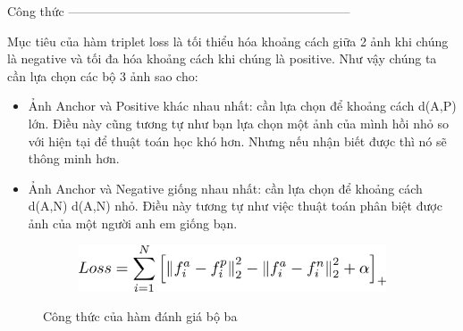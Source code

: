 Công thức --------------------------------------------------------------------

Mục tiêu của hàm triplet loss là tối thiểu hóa khoảng cách giữa 2 ảnh khi chúng là
negative và tối đa hóa khoảng cách khi chúng là positive.
Như vậy chúng ta cần lựa chọn các bộ 3 ảnh sao cho:
\begin{itemize}
    \item Ảnh Anchor và Positive khác nhau nhất: cần lựa chọn để khoảng cách d(A,P) lớn.
          Điều này cũng tương tự như bạn lựa chọn một ảnh của mình hồi nhỏ so với hiện tại để
          thuật toán học khó hơn. Nhưng nếu nhận biết được thì nó sẽ thông minh hơn.
    \item Ảnh Anchor và Negative giống nhau nhất: cần lựa chọn để khoảng cách d(A,N)
          d(A,N) nhỏ. Điều này tương tự như việc thuật toán phân biệt được ảnh của một người
          anh em giống bạn.
\end{itemize}

\begin{figure}
    \begin{subfigure}{0.8\textwidth}
        \begin{center}
            \includegraphics[width=1.\linewidth]{Chapters/items/fomura.png}
        \end{center}
        \label{fig: fomura}
    \end{subfigure}
    \caption{Công thức của hàm đánh giá bộ ba}
\end{figure}


